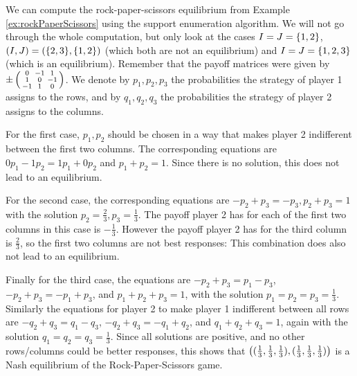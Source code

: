 \documentclass[a4paper]{scrreprt}
\begin{document}
    \begin{ex}
        We can compute the rock-paper-scissors equilibrium from Example \ref{ex:rockPaperScissors} using the support enumeration algorithm.
        We will not go through the whole computation, but only look at the cases $I = J = \{1, 2\}$, $(I, J) = (\{2, 3\}, \{1, 2\})$ (which both are not an equilibrium) and $I = J = \{1, 2, 3\}$ (which is an equilibrium). Remember that the payoff matrices were given by $\pm \left(\begin{smallmatrix}0 & -1 & 1 \\ 1 & 0 & -1 \\ -1 & 1 & 0\end{smallmatrix}\right)$. We denote by $p_1, p_2, p_3$ the probabilities the strategy of player 1 assigns to the rows, and by $q_1, q_2, q_3$ the probabilities the strategy of player 2 assigns to the columns.
        
        For the first case, $p_1, p_2$ should be chosen in a way that makes player 2 indifferent between the first two columns. The corresponding equations are $0p_1 - 1p_2 = 1p_1 + 0p_2$ and $p_1 + p_2 = 1$. Since there is no solution, this does not lead to an equilibrium.
        
        For the second case, the corresponding equations are $-p_2 + p_3 = -p_3, p_2 + p_3 = 1$ with the solution $p_2 = \frac{2}{3}, p_3 = \frac{1}{3}$. The payoff player 2 has for each of the first two columns in this case is $-\frac{1}{3}$. However the payoff player 2 has for the third column is $\frac{2}{3}$, so the first two columns are not best responses: This combination does also not lead to an equilibrium.
        
        Finally for the third case, the equations are $-p_2 + p_3 = p_1 - p_3$, $-p_2 + p_3 = -p_1 + p_3$, and $p_1 + p_2 + p_3 = 1$, with the solution $p_1 = p_2 = p_3 = \frac{1}{3}$. Similarly the equations for player 2 to make player 1 indifferent between all rows are $-q_2 + q_3 = q_1 - q_3$, $-q_2 + q_3 = -q_1 + q_2$, and $q_1 + q_2 + q_3 = 1$, again with the solution $q_1 = q_2 = q_3 = \frac{1}{3}$. Since all solutions are positive, and no other rows/columns could be better responses, this shows that $\left((\frac{1}{3}, \frac{1}{3}, \frac{1}{3}), (\frac{1}{3}, \frac{1}{3}, \frac{1}{3})\right)$ is a Nash equilibrium of the Rock-Paper-Scissors game.
    \end{ex}
    
\end{document}
